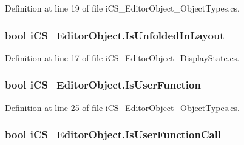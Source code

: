Definition at line 19 of file i\+C\+S\+\_\+\+Editor\+Object\+\_\+\+Object\+Types.\+cs.

\hypertarget{classi_c_s___editor_object_ac16395ba937023b3fa85e17702e986c5}{
\subsubsection[{Is\+Unfolded\+In\+Layout}]{\setlength{\rightskip}{0pt plus 5cm}bool i\+C\+S\+\_\+\+Editor\+Object.\+Is\+Unfolded\+In\+Layout\hspace{0.3cm}{\ttfamily [get]}}}\label{classi_c_s___editor_object_ac16395ba937023b3fa85e17702e986c5}


Definition at line 17 of file i\+C\+S\+\_\+\+Editor\+Object\+\_\+\+Display\+State.\+cs.

\hypertarget{classi_c_s___editor_object_ae06bdbeec62fddd77e22d30cfa79c972}{
\subsubsection[{Is\+User\+Function}]{\setlength{\rightskip}{0pt plus 5cm}bool i\+C\+S\+\_\+\+Editor\+Object.\+Is\+User\+Function\hspace{0.3cm}{\ttfamily [get]}}}\label{classi_c_s___editor_object_ae06bdbeec62fddd77e22d30cfa79c972}


Definition at line 25 of file i\+C\+S\+\_\+\+Editor\+Object\+\_\+\+Object\+Types.\+cs.

\hypertarget{classi_c_s___editor_object_a04070d1b905b9d866de45e72d9460951}{
\subsubsection[{Is\+User\+Function\+Call}]{\setlength{\rightskip}{0pt plus 5cm}bool i\+C\+S\+\_\+\+Editor\+Object.\+Is\+User\+Function\+Call\hspace{0.3cm}{\ttfamily [get]}}}\label{classi_c_s___editor_object_a04070d1b905b9d866de45e72d9460951}


